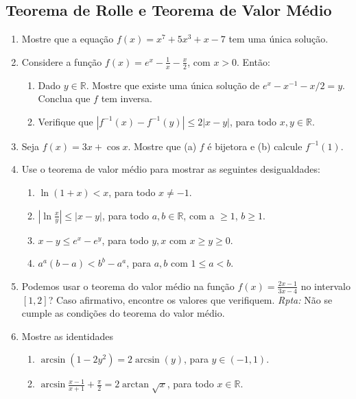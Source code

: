 \documentclass[latin,20pt]{article}
\begin{document}
    \subsection{Teorema de Rolle e Teorema de Valor Médio}
      \begin{enumerate}
      \item Mostre que a equação $f(x)=x^{7}+5x^{3}+x-7$ tem uma única solução.      
      \item Considere a função $f(x)=e^{x}-\frac{1}{x}-\frac{x}{2}$, com $x>0$. 
      Então: 
        \begin{enumerate}
        \item Dado $y \in \mathbb{R}$. Mostre que existe uma única solução 
        de $e^{x}-x^{-1}-x/2=y$. Conclua que $f$ tem inversa.
        \item Verifique que $|f^{-1}(x)-f^{-1}(y)| \leq 2 |x-y|$, para todo 
        $x, y \in \mathbb{R}$.
        \end{enumerate}
      \item Seja $f(x)=3x+\cos x$. Mostre que (a) 
      $f$ é bijetora e (b) calcule $f^{-1}(1)$.
      \item Use o teorema de valor médio para 
      mostrar as seguintes desigualdades:
           \begin{enumerate}
           \item $\ln(1+x)<x$, para todo $x \neq -1$.
           \item $|\ln \frac{x}{y}|\leq |x-y|$, para todo 
           $a, b \in \mathbb{R}$, 
           com a $\geq 1$, $b \geq 1$.
           \item $x-y \leq e^{x}-e^{y}$, para todo $y, x$ 
           com $x \geq y \geq 0$.
           \item $a^{a}(b-a)<b^{b}-a^{a}$, para $a, b$ com $1 \leq a<b$.
           \end{enumerate}
      \item Podemos usar o teorema do valor médio na função 
      $f(x)=\frac{2x-1}{3x-4}$ no intervalo $[1,2]$? 
      Caso afirmativo, encontre os valores que 
      verifiquem. {\it Rpta:} Não se cumple as condições 
      do teorema do valor médio.  
      \item Mostre as identidades
        \begin{enumerate}
        \item $\arcsin (1-2y^{2})=2 \arcsin (y)$, para $y \in (-1,1)$.
        \item $\arcsin \frac{x-1}{x+1}+\frac{\pi}{2}=2 \arctan \sqrt{x}$,
        para todo $x \in \mathbb{R}$.
        \end{enumerate}            
      \end{enumerate}      
      
      
      
      
      
      
      
\end{document}
